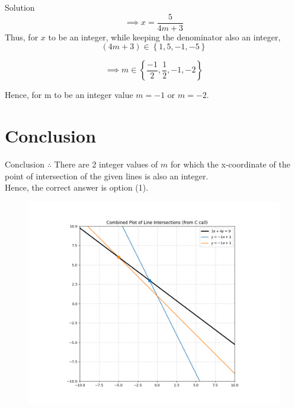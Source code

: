 \documentclass{beamer}
\providecommand{\brak}[1]{\ensuremath{\left(#1\right)}}
\providecommand{\cbrak}[1]{\ensuremath{\left\{#1\right\}}}
\theoremstyle{remark}
\begin{document}
\begin{frame}{Solution}
\begin{equation}
    \implies x = \frac{5}{4m+3}
\end{equation}
Thus, for $x$ to be an integer, while keeping the denominator also an integer,\\
\begin{equation}
\brak{4m+3} \in \cbrak{1,5,-1,-5}
\end{equation}

\begin{equation}
    \implies m \in \cbrak{\frac{-1}{2},\frac{1}{2},-1,-2}
\end{equation}

Hence, for m to be an integer value $m = -1$ or $m = -2$.
\end{frame}

\section{Conclusion}
\begin{frame}{Conclusion}
$\therefore$ There are 2 integer values of $m$ for which the x-coordinate of the point of intersection of the given lines is also an integer.\\
Hence, the correct answer is option (1).

\begin{figure}[H]
    \centering
    \includegraphics[width=0.65\columnwidth]{figs/1.png}
    \caption{}
\end{figure}

\end{frame}
\end{document}
